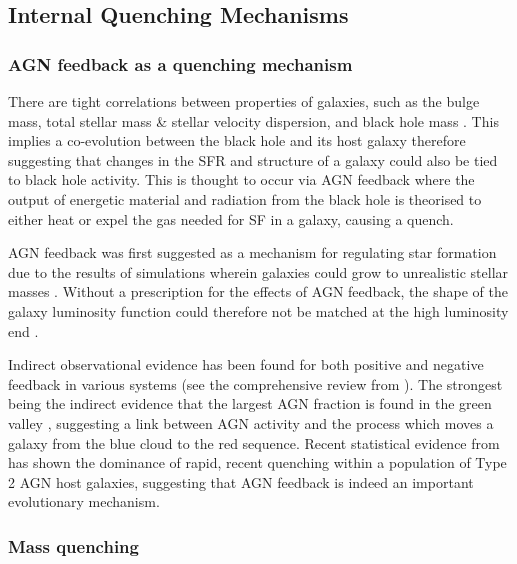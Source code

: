 \documentclass[useAMS,usenatbib]{mn2e}
\begin{document}
\subsection{Internal Quenching Mechanisms}\label{sec:intquench}

\subsubsection{AGN feedback as a quenching mechanism}\label{sec:agnquench}

There are tight correlations between properties of galaxies, such as the bulge mass, total stellar mass \& stellar velocity dispersion, and black hole mass \citep{magorrian98, marconi03, haringrix04}. This implies a co-evolution between the black hole and its host galaxy therefore suggesting that changes in the SFR and structure of a galaxy could also be tied to black hole activity. This is thought to occur via AGN feedback where the output of energetic material and radiation from the black hole is theorised to either heat or expel the gas needed for SF in a galaxy, causing a quench.

AGN feedback was first suggested as a mechanism for regulating star formation due to the results of simulations wherein galaxies could grow to unrealistic stellar masses \citep{silk98, Bower06, Croton06, somerville08}. Without a prescription for the effects of AGN feedback, the shape of the galaxy luminosity function could therefore not be matched at the high luminosity end \citep{baugh98, baugh05, kauffmann99a, kauffmann99b, somerville01, kitzbichler06}. 

Indirect observational evidence has been found for both positive and negative feedback in various systems (see the comprehensive review from \citealt{fabian12}). The strongest being the indirect evidence that the largest AGN fraction is found in the green valley \citep{cowie08, Hickox09, schawinski10a}, suggesting a link between AGN activity and the process which moves a galaxy from the blue cloud to the red sequence. Recent statistical evidence from \cite{smethurst16} has shown the dominance of rapid, recent quenching within a population of Type 2 AGN host galaxies, suggesting that AGN feedback is indeed an important evolutionary mechanism. 


\subsubsection{Mass quenching}\label{sec:massquench}
\end{document}
